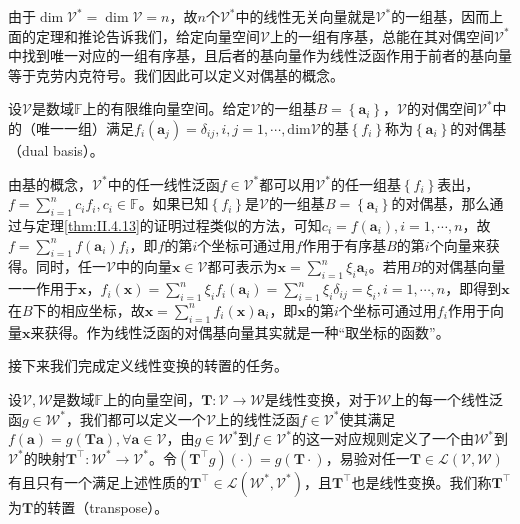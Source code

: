 \documentclass[main.tex]{subfiles}
\begin{document}
由于$\dim\mathcal{V}^*=\dim\mathcal{V}=n$，故$n$个$\mathcal{V}^*$中的线性无关向量就是$\mathcal{V}^*$的一组基，因而上面的定理和推论告诉我们，给定向量空间$\mathcal{V}$上的一组有序基，总能在其对偶空间$\mathcal{V}^*$中找到唯一对应的一组有序基，且后者的基向量作为线性泛函作用于前者的基向量等于克劳内克符号。我们因此可以定义对偶基的概念。

\begin{definition}[对偶基]\label{def:II.4.5}
设$\mathcal{V}$是数域$\mathbb{F}$上的有限维向量空间。给定$\mathcal{V}$的一组基$B=\left\{\mathbf{a}_i\right\}$，$\mathcal{V}$的对偶空间$\mathcal{V}^*$中的（唯一一组）满足$f_i\left(\mathbf{a}_j\right)=\delta_{ij},i,j=1,\cdots,\mathrm{dim}\mathcal{V}$的基$\left\{f_i\right\}$称为$\left\{\mathbf{a}_i\right\}$的对偶基（dual basis）。
\end{definition}

由基的概念，$\mathcal{V}^*$中的任一线性泛函$f\in\mathcal{V}^*$都可以用$\mathcal{V}^*$的任一组基$\left\{f_i\right\}$表出，$f=\sum_{i=1}^nc_if_i,c_i\in\mathbb{F}$。如果已知$\left\{f_i\right\}$是$\mathcal{V}$的一组基$B=\left\{\mathbf{a}_i\right\}$的对偶基，那么通过与定理\ref{thm:II.4.13}的证明过程类似的方法，可知$c_i=f\left(\mathbf{a}_i\right),i=1,\cdots,n$，故$f=\sum_{i=1}^nf\left(\mathbf{a}_i\right)f_i$，即$f$的第$i$个坐标可通过用$f$作用于有序基$B$的第$i$个向量来获得。同时，任一$\mathcal{V}$中的向量$\mathbf{x}\in\mathcal{V}$都可表示为$\mathbf{x}=\sum_{i=1}^n\xi_i\mathbf{a}_i$。若用$B$的对偶基向量一一作用于$\mathbf{x}$，$f_i\left(\mathbf{x}\right)=\sum_{i=1}^n\xi_if_i\left(\mathbf{a}_i\right)=\sum_{i=1}^n\xi_i\delta_{ij}=\xi_i,i=1,\cdots,n$，即得到$\mathbf{x}$在$B$下的相应坐标，故$\mathbf{x}=\sum_{i=1}^nf_i\left(\mathbf{x}\right)\mathbf{a}_i$，即$\mathbf{x}$的第$i$个坐标可通过用$f_i$作用于向量$\mathbf{x}$来获得。作为线性泛函的对偶基向量其实就是一种“取坐标的函数”。

接下来我们完成定义线性变换的转置的任务。

\begin{definition}[线性变换的转置]\label{def:II.4.6}
设$\mathcal{V},\mathcal{W}$是数域$\mathbb{F}$上的向量空间，$\mathbf{T}:\mathcal{V}\rightarrow\mathcal{W}$是线性变换，对于$\mathcal{W}$上的每一个线性泛函$g\in\mathcal{W}^*$，我们都可以定义一个$\mathcal{V}$上的线性泛函$f\in\mathcal{V}^*$使其满足$f\left(\mathbf{a}\right)=g\left(\mathbf{Ta}\right),\forall \mathbf{a}\in\mathcal{V}$，由$g\in\mathcal{W}^*$到$f\in\mathcal{V}^*$的这一对应规则定义了一个由$\mathcal{W}^*$到$\mathcal{V}^*$的映射$\mathbf{T}^\intercal:\mathcal{W}^*\rightarrow\mathcal{V}^*$。令$\left(\mathbf{T}^\intercal g\right)\left(\cdot\right)=g\left(\mathbf{T}\cdot\right)$，易验对任一$\mathbf{T}\in\mathcal{L}\left(\mathcal{V},\mathcal{W}\right)$有且只有一个满足上述性质的$\mathbf{T}^\intercal\in\mathcal{L}\left(\mathcal{W}^*,\mathcal{V}^*\right)$，且$\mathbf{T}^\intercal$也是线性变换。我们称$\mathbf{T}^\intercal$为$\mathbf{T}$的转置（transpose）。
\end{definition}
\end{document}
